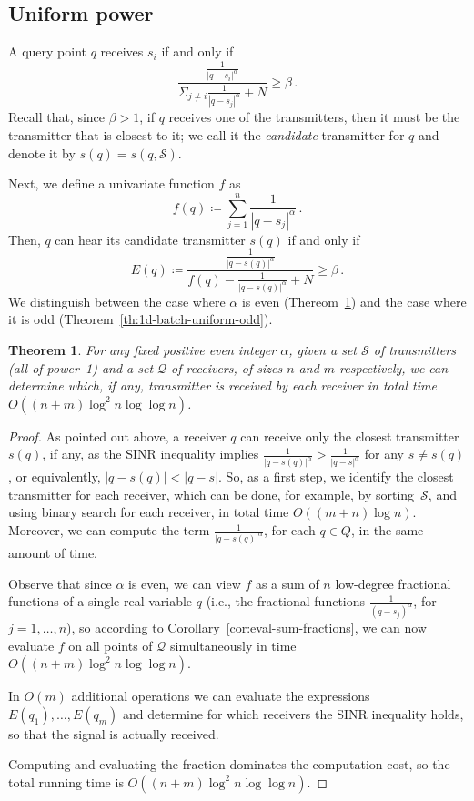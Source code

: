 \documentclass[11pt]{article}
\newtheorem{theorem}{Theorem}[section]
\theoremstyle{remark}
\def\Q{\mathcal{Q}}
\def\S{\mathcal{S}}
\begin{document}
\subsection{Uniform power}
\label{sec:1d-uni}

A query point $q$ receives $s_i$ if and only if
\[
  \frac{\frac{1}{|q-s_i|^\alpha}}{\Sigma_{j \ne i}{\frac{1}{|q-s_j|^\alpha}} + N} \geq \beta \, .
\]
Recall that, since $\beta > 1$, if $q$ receives one of the transmitters, then it must be the transmitter that is closest to it; we call it the \emph{candidate} transmitter for $q$ and denote it by $s(q)=s(q,\S)$.


Next, we define a univariate function $f$ as
\[
f(q) \coloneqq \sum_{j = 1}^n {\frac{1}{|q-s_j|^\alpha}}\, .
\]
Then, $q$ can hear its candidate transmitter $s(q)$ if and only if 
\[
E(q) \coloneqq \frac{\frac{1}{|q-s(q)|^\alpha}}{f(q) - \frac{1}{|q-s(q)|^\alpha} + N} \geq \beta \, .
\]
We distinguish between the case where $\alpha$ is even (Thereom~\ref{th:1d-batch-uniform}) and the case where it is odd (Theorem~\ref{th:1d-batch-uniform-odd}).
\begin{theorem}
  \label{th:1d-batch-uniform}
  For any fixed positive even integer $\alpha$, given a set $\S$ of
  transmitters (all of power~1) and a set $\Q$ of receivers, of sizes
  $n$ and $m$ respectively, we can determine which, if any,
  transmitter is received by each receiver in total time $O((n+m)
  \log^2 n \log \log n)$.
\end{theorem}

\begin{proof}
  As pointed out above, a receiver $q$ can receive only the closest
  transmitter $s(q)$, if any, as the SINR inequality implies
  $\frac{1}{{|q-s(q)|}^\alpha} > \frac{1}{{|q-s|}^\alpha}$ for any $s\neq s(q)$, or
  equivalently, $|q-s(q)|<|q-s|$.  So, as a
  first step, we identify the closest transmitter for each receiver,
  which can be done, for example, by sorting~$\S$, and using binary search for each
  receiver, in total time $O((m+n)\log n)$.  Moreover, we can compute
  the term $\frac{1}{{|q-s(q)|}^\alpha}$, for each $q \in Q$, in the same 
  amount of time.

  Observe that since $\alpha$ is even, we can view
  $f$ as a sum of $n$ low-degree fractional functions of a single real variable $q$ (i.e., the fractional functions $\frac{1}{(q-s_j)^\alpha}$, for $j=1,\ldots,n$), so 
according to Corollary~\ref{cor:eval-sum-fractions}, we can now
evaluate $f$ on all points of $\Q$ simultaneously in time $O((n+m)
  \log^2 n \log \log n)$.  

  In $O(m)$ additional operations we can evaluate the expressions
  $E(q_1),\dots,E(q_m)$ and determine for which receivers the SINR
  inequality holds, so that the signal is actually received.

  Computing and evaluating the fraction dominates the computation cost, so the
  total running time is $O((n + m) \log^2 n \log \log n)$.
\end{proof}
\end{document}
